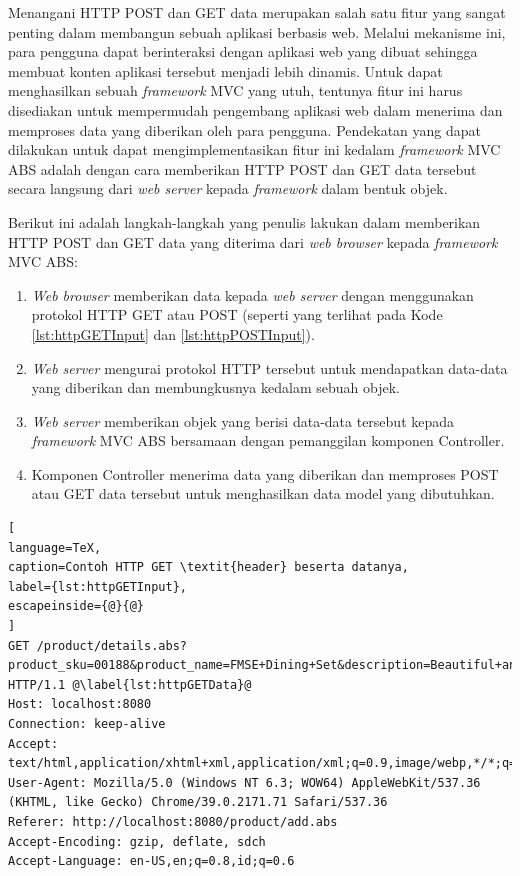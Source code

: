 Menangani HTTP POST dan GET data merupakan salah satu fitur yang sangat penting dalam membangun sebuah aplikasi berbasis web. Melalui mekanisme ini, para pengguna dapat berinteraksi dengan aplikasi web yang dibuat sehingga membuat konten aplikasi tersebut menjadi lebih dinamis. Untuk dapat menghasilkan sebuah \textit{framework} MVC yang utuh, tentunya fitur ini harus disediakan untuk mempermudah pengembang aplikasi web dalam menerima dan memproses data yang diberikan oleh para pengguna. Pendekatan yang dapat dilakukan untuk dapat mengimplementasikan fitur ini kedalam \textit{framework} MVC ABS adalah dengan cara memberikan HTTP POST dan GET data tersebut secara langsung dari \textit{web server} kepada \textit{framework} dalam bentuk objek.

Berikut ini adalah langkah-langkah yang penulis lakukan dalam memberikan HTTP POST dan GET data yang diterima dari \textit{web browser} kepada \textit{framework} MVC ABS:

\begin{enumerate}
    \item \textit{Web browser} memberikan data kepada \textit{web server} dengan menggunakan protokol HTTP GET atau POST (seperti yang terlihat pada Kode \ref{lst:httpGETInput} dan \ref{lst:httpPOSTInput}).
    \item \textit{Web server} mengurai protokol HTTP tersebut untuk mendapatkan data-data yang diberikan dan membungkusnya kedalam sebuah objek.
    \item \textit{Web server} memberikan objek yang berisi data-data tersebut kepada \textit{framework} MVC ABS bersamaan dengan pemanggilan komponen Controller.
    \item Komponen Controller menerima data yang diberikan dan memproses POST atau GET data tersebut untuk menghasilkan data model yang dibutuhkan.
\end{enumerate}

\begin{lstlisting}[
language=TeX,
caption=Contoh HTTP GET \textit{header} beserta datanya,
label={lst:httpGETInput},
escapeinside={@}{@}
]
GET /product/details.abs?product_sku=00188&product_name=FMSE+Dining+Set&description=Beautiful+and+Cute+Dining+Set&price=250000 HTTP/1.1 @\label{lst:httpGETData}@
Host: localhost:8080
Connection: keep-alive
Accept: text/html,application/xhtml+xml,application/xml;q=0.9,image/webp,*/*;q=0.8
User-Agent: Mozilla/5.0 (Windows NT 6.3; WOW64) AppleWebKit/537.36 (KHTML, like Gecko) Chrome/39.0.2171.71 Safari/537.36
Referer: http://localhost:8080/product/add.abs
Accept-Encoding: gzip, deflate, sdch
Accept-Language: en-US,en;q=0.8,id;q=0.6
\end{lstlisting}

